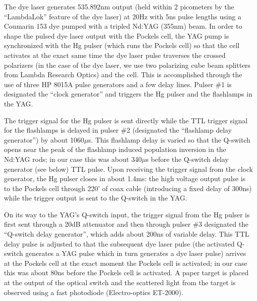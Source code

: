 \label{Pockels cell pulse section}

The dye laser generates 535.892nm output (held within 2 picometers by the ``LambdaLok'' feature of the dye laser) at 20Hz with 5ns pulse lengths using a Coumarin 153 dye pumped with a tripled Nd:YAG (355nm) beam. In order to shape the pulsed dye laser output with the Pockels cell, the YAG pump is synchronized with the Hg pulser (which runs the Pockels cell) so that the cell activates at the exact same time the dye laser pulse traverses the crossed polarizers (in the case of the dye laser, we use two polarizing cube beam splitters from Lambda Research Optics) and the cell. This is accomplished through the use of three HP 8015A pulse generators and a few delay lines. Pulser \#1 is designated the ``clock generator'' and triggers the Hg pulser and the flashlamps in the YAG.


The trigger signal for the Hg pulser is sent directly while the TTL trigger signal for the flashlamps is delayed in pulser \#2 (designated the ``flashlamp delay generator'') by about 1060$\mu$s. This flashlamp delay is varied so that the Q-switch opens near the peak of the flashlamp induced population inversion in the Nd:YAG rods; in our case this was about 340$\mu$s before the Q-switch delay generator (see below) TTL pulse. Upon receiving the trigger signal from the clock generator, the Hg pulser closes in about 1.4ms: the high voltage output pulse is to the Pockels cell through 220' of coax cable (introducing a fixed delay of 300ns) while the trigger output is sent to the Q-switch in the YAG.


On its way to the YAG's Q-switch input, the trigger signal from the Hg pulser is first sent through a 20dB attenuator and then through pulser \#3 designated the ``Q-switch delay generator'', which adds about 200ns of variable delay. This TTL delay pulse is adjusted to that the subsequent dye laser pulse (the activated Q-switch generates a YAG pulse which in turn generates a dye laser pulse) arrives at the Pockels cell at the exact moment the Pockels cell is activated; in our case this was about 80ns before the Pockels cell is activated. A paper target is placed at the output of the optical switch and the scattered light from the target is observed using a fast photodiode (Electro-optics ET-2000).

